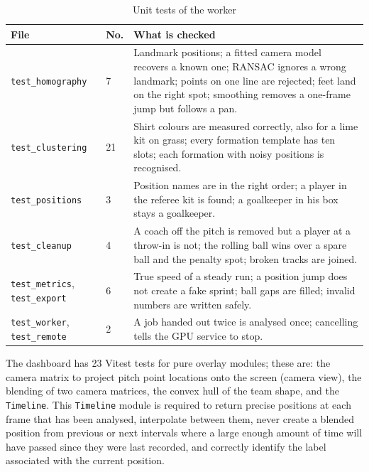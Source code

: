 \begin{table}[H]
	\centering
	\begin{tabular}{|p{}|p{}|p{}|}
		\hline
		\textbf{File} & \textbf{No.} & \textbf{What is checked} \\
		\hline
		\texttt{test\_\allowbreak{}homography} & 7 & Landmark positions; a fitted camera model recovers a known one; RANSAC ignores a wrong landmark; points on one line are rejected; feet land on the right spot; smoothing removes a one-frame jump but follows a pan. \\
		\hline
		\texttt{test\_\allowbreak{}clustering} & 21 & Shirt colours are measured correctly, also for a lime kit on grass; every formation template has ten slots; each formation with noisy positions is recognised. \\
		\hline
		\texttt{test\_\allowbreak{}positions} & 3 & Position names are in the right order; a player in the referee kit is found; a goalkeeper in his box stays a goalkeeper. \\
		\hline
		\texttt{test\_cleanup} & 4 & A coach off the pitch is removed but a player at a throw-in is not; the rolling ball wins over a spare ball and the penalty spot; broken tracks are joined. \\
		\hline
		\texttt{test\_metrics}, \texttt{test\_export} & 6 & True speed of a steady run; a position jump does not create a fake sprint; ball gaps are filled; invalid numbers are written safely. \\
		\hline
		\texttt{test\_worker}, \texttt{test\_remote} & 2 & A job handed out twice is analysed once; cancelling tells the GPU service to stop. \\
		\hline
	\end{tabular}
	\caption{Unit tests of the worker}
	\label{tab:worker-tests}
\end{table}

The dashboard has 23 Vitest tests for pure overlay modules; these are: the camera matrix to project pitch point locations onto the screen (camera view), the blending of two camera matrices, the convex hull of the team shape, and the \texttt{Timeline}. This \texttt{Timeline} module is required to return precise positions at each frame that has been analysed, interpolate between them, never create a blended position from previous or next intervals where a large enough amount of time will have passed since they were last recorded, and correctly identify the label associated with the current position.

